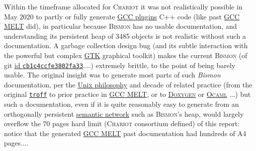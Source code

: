 Within the timeframe allocated for \textsc{Chariot} it was not
realistically possible in May 2020 to partly or fully generate
\href{https://gcc.gnu.org/onlinedocs/gccint/Plugins.html}{GCC plugins}
C++ code (like past
\href{http://starynkevitch.net/Basile/gcc-melt/}{GCC MELT} did), in
particular because \textsc{Bismon} has no usable documentation, and
understanding its persistent heap of 3485 objects is not realistic
without such a documentation. A garbage collection
\cite{Jones:2016:GC-handbook} design bug (and its subtle interaction
with the powerful but complex \href{https://www.gtk.org/}{GTK}
graphical toolkit) makes the current \textsc{Bismon} (of git
\href{https://github.com/bstarynk/bismon/commit/cb1c4ccfe3802fa330d48fc97c2913943736ba2f}{id
  \texttt{cb1c4ccfe3802fa33}}....) extremely brittle, to the point of
being barely usable. The original insight was to generate most parts
of such \emph{Bismon} documentation, per the
\href{https://en.wikipedia.org/wiki/Unix_philosophy}{Unix philosophy}
and decade of related practice (from the original
\href{https://www.troff.org/}{\texttt{troff}} to prior practice in
\href{http://starynkevitch.net/Basile/gcc-melt/}{GCC MELT}, or to
\href{https://www.doxygen.nl/}{\textsc{Doxygen}} or
\href{http://ocaml.org/}{\textsc{Ocaml}} ...) but such a
documentation, even if it is quite reasonably easy to generate from an
orthogonally persistent
\href{https://en.wikipedia.org/wiki/Semantic_network}{semantic
  network} such as \textsc{Bismon}'s heap, would largely overflow the
70 pages hard limit (\textsc{Chariot} consortium defined) of this
report: notice that the generated
\href{http://starynkevitch.net/Basile/gcc-melt/}{GCC MELT}  past documentation had hundreds of A4
pages....


